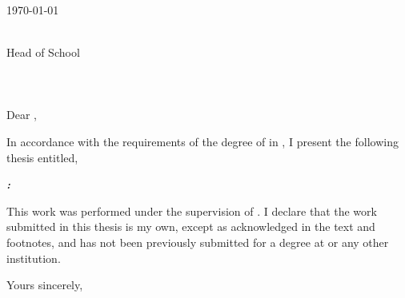 \makeatletter
\vspace*{10mm}
\begin{flushright}
    \@author\\
    \@email\\
    \@phone\\
    \today
\end{flushright}
\vspace*{10mm}
\begin{flushleft}
    \@hod\\
    Head of School\\
    \@department\\
    \@university\\
    \@address\\
    \bigskip\bigskip\bigskip
    Dear \@hod,
    \bigskip
\end{flushleft}

\noindent In accordance with the requirements of the degree of \@degree in \@department, I present the following thesis entitled,

\begin{center}
\bigskip
\textbf{\emph{\@title:\\\@subtitle}}
\bigskip
\end{center}

\noindent This work was performed under the supervision of \@supervisor. I declare that the work submitted in this thesis is my own, except as acknowledged in the text and footnotes, and has not been previously submitted for a degree at \@university or any other institution.

\begin{flushright}
    \bigskip
    Yours sincerely,\\
    \bigskip
    \@author
\end{flushright}
\makeatother
\cleardoublepage


